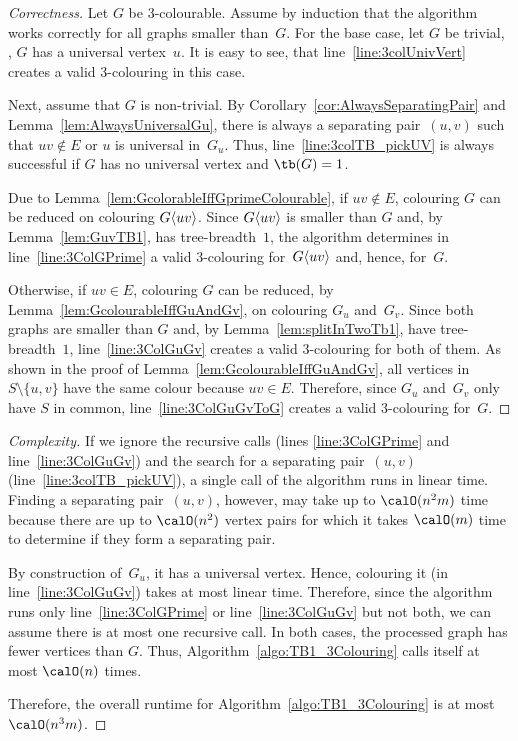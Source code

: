 \begin{proof}
    [Correctness]
Let $G$ be 3-colourable.
Assume by induction that the algorithm works correctly for all graphs smaller than~$G$.
For the base case, let $G$ be trivial, \ie, $G$ has a universal vertex~$u$.
It is easy to see, that line~\ref{line:3colUnivVert} creates a valid 3-colouring in this case.

Next, assume that $G$ is non-trivial.
By Corollary~\ref{cor:AlwaysSeparatingPair} and Lemma~\ref{lem:AlwaysUniversalGu}, there is always a separating pair~$(u, v)$ such that $uv \notin E$ or $u$ is universal in~$G_u$.
Thus, line~\ref{line:3colTB_pickUV} is always successful if $G$ has no universal vertex and $\tb(G) = 1$.

Due to Lemma~\ref{lem:GcolorableIffGprimeColourable}, if $uv \notin E$, colouring $G$ can be reduced on colouring $G \langle uv \rangle$.
Since $G \langle uv \rangle$ is smaller than $G$ and, by Lemma~\ref{lem:GuvTB1}, has tree-breadth~$1$, the algorithm determines in line~\ref{line:3ColGPrime} a valid 3-colouring for~$G \langle uv \rangle$ and, hence, for~$G$.

Otherwise, if $uv \in E$, colouring $G$ can be reduced, by Lemma~\ref{lem:GcolourableIffGuAndGv}, on colouring $G_u$ and~$G_v$.
Since both graphs are smaller than $G$ and, by Lemma~\ref{lem:splitInTwoTb1}, have tree-breadth~$1$, line~\ref{line:3ColGuGv} creates a valid 3-colouring for both of them.
As shown in the proof of Lemma~\ref{lem:GcolourableIffGuAndGv}, all vertices in~$S \setminus \{ u, v \}$ have the same colour because $uv \in E$.
Therefore, since $G_u$ and~$G_v$ only have $S$ in common, line~\ref{line:3ColGuGvToG} creates a valid 3-colouring for~$G$.
\end{proof}

\begin{proof}
    [Complexity]
If we ignore the recursive calls (lines \ref{line:3ColGPrime} and line~\ref{line:3ColGuGv}) and the search for a separating pair~$(u, v)$ (line~\ref{line:3colTB_pickUV}), a single call of the algorithm runs in linear time.
Finding a separating pair~$(u, v)$, however, may take up to $\calO(n^2m)$ time because there are up to $\calO(n^2)$ vertex pairs for which it takes $\calO(m)$ time to determine if they form a separating pair.

By construction of~$G_u$, it has a universal vertex.
Hence, colouring it (in line~\ref{line:3ColGuGv}) takes at most linear time.
Therefore, since the algorithm runs only line~\ref{line:3ColGPrime} or line~\ref{line:3ColGuGv} but not both, we can assume there is at most one recursive call.
In both cases, the processed graph has fewer vertices than $G$.
Thus, Algorithm~\ref{algo:TB1_3Colouring} calls itself at most $\calO(n)$ times.

Therefore, the overall runtime for Algorithm~\ref{algo:TB1_3Colouring} is at most $\calO(n^3m)$.
\end{proof}
